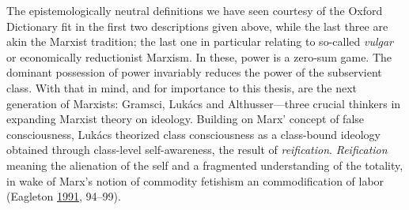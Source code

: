 \documentclass[10pt,british,A4paper,,openany]{memoir}
\begin{document}
The epistemologically neutral definitions we have seen courtesy of the
Oxford Dictionary fit in the first two descriptions given above, while
the last three are akin the Marxist tradition; the last one in
particular relating to so-called \emph{vulgar} or economically
reductionist Marxism. In these, power is a zero-sum game. The dominant
possession of power invariably reduces the power of the subservient
class. With that in mind, and for importance to this thesis, are the
next generation of Marxists: Gramsci, Lukács and Althusser---three
crucial thinkers in expanding Marxist theory on ideology. Building on
Marx' concept of false consciousness, Lukács theorized class
consciousness as a class-bound ideology obtained through class-level
self-awareness, the result of \emph{reification}. \emph{Reification}
meaning the alienation of the self and a fragmented understanding of the
totality, in wake of Marx's notion of commodity fetishism an
commodification of labor (Eagleton
\protect\hyperlink{ref-eagleton_ideology:_1991}{1991}, 94--99).
\end{document}
